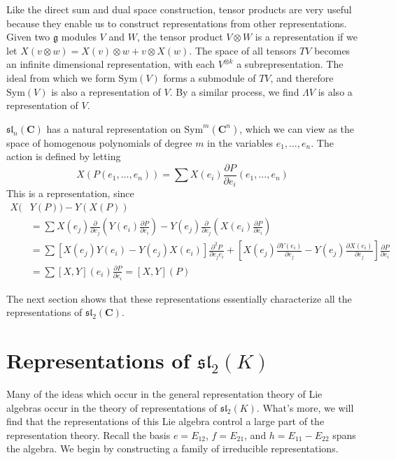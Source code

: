Like the direct sum and dual space construction, tensor products are very useful because they enable us to construct representations from other representations. Given two $\mathfrak{g}$ modules $V$ and $W$, the tensor product $V \otimes W$ is a representation if we let $X(v \otimes w) = X(v) \otimes w + v \otimes X(w)$. The space of all tensors $TV$ becomes an infinite dimensional representation, with each $V^{\otimes k}$ a subrepresentation. The ideal from which we form $\text{Sym}(V)$ forms a submodule of $TV$, and therefore $\text{Sym}(V)$ is also a representation of $V$. By a similar process, we find $\Lambda V$ is also a representation of $V$.

\begin{example}
    $\mathfrak{sl}_n(\mathbf{C})$ has a natural representation on $\text{Sym}^m(\mathbf{C}^n)$, which we can view as the space of homogenous polynomials of degree $m$ in the variables $e_1, \dots, e_n$. The action is defined by letting
    \[ X\left( P(e_1, \dots, e_n) \right) = \sum X(e_i) \frac{\partial P}{\partial e_i}(e_1, \dots, e_n) \]
    This is a representation, since
    \begin{align*}
        X(&Y(P)) - Y(X(P))\\
        &= \sum X(e_j) \frac{\partial}{\partial e_j} \left( Y(e_i) \frac{\partial P}{\partial e_i} \right) - Y(e_j) \frac{\partial}{\partial e_j} \left( X(e_i) \frac{\partial P}{\partial e_i} \right)\\
        &= \sum [X(e_j) Y(e_i) - Y(e_j) X(e_i)] \frac{\partial^2 P}{\partial e_j e_i} + \left[ X(e_j) \frac{\partial Y(e_i)}{\partial e_j} - Y(e_j) \frac{\partial X(e_i)}{\partial e_j} \right] \frac{\partial P}{\partial e_i}\\
        &= \sum [X,Y](e_i) \frac{\partial P}{\partial e_i} = [X,Y](P)
    \end{align*}
\end{example}

The next section shows that these representations essentially characterize all the representations of $\mathfrak{sl}_2(\mathbf{C})$.

\section{Representations of $\mathfrak{sl}_2(K)$}

Many of the ideas which occur in the general representation theory of Lie algebras occur in the theory of representations of $\mathfrak{sl}_2(K)$. What's more, we will find that the representations of this Lie algebra control a large part of the representation theory. Recall the basis $e = E_{12}$, $f = E_{21}$, and $h = E_{11} - E_{22}$ spans the algebra. We begin by constructing a family of irreducible representations.

